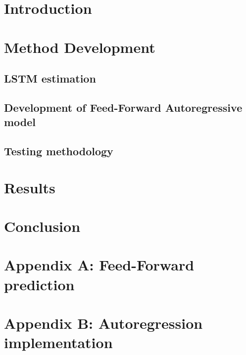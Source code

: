 \documentclass[journal]{IEEEtranTIE}
\begin{document}

\section{Introduction} \label{sec:Introduction}

\section{Method Development} \label{sec:layer}
\subsection{LSTM estimation}

\subsection{Development of Feed-Forward Autoregressive model} \label{sec:feed}

\subsection{Testing methodology}

\section{Results} \label{sec:results}

\section{Conclusion} \label{sec:conclussion}





%
%
{
\clearpage
\appendices
\section{Appendix A: Feed-Forward prediction}  \label{app:Feed-Forward}

\clearpage
\section{Appendix B: Autoregression implementation}  \label{app:AutoFeedback}

}
{}
\end{document}
